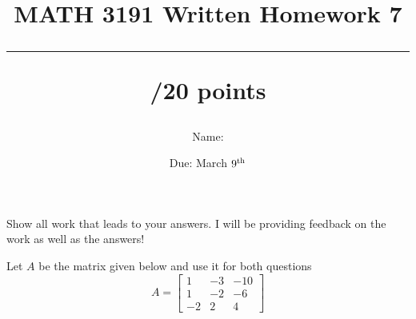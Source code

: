 \documentclass{exam}
\title{MATH 3191 Written Homework 7\\\rule{30pt}{1pt}/20 points}
\author{Name: \rule{150pt}{1pt}}
\date{Due: March $9^\textnormal{th}$}
\begin{document}
\maketitle
Show all work that leads to your answers. I will be providing feedback on the work as well as the answers!
\begin{questions}
    \question Let $A$ be the matrix given below and use it for both questions
    \[
        A = \begin{bmatrix}
            1 & -3 & -10\\
            1 & -2 & -6 \\
            -2&  2 &  4
        \end{bmatrix}
    \]
\end{questions}
\end{document}
